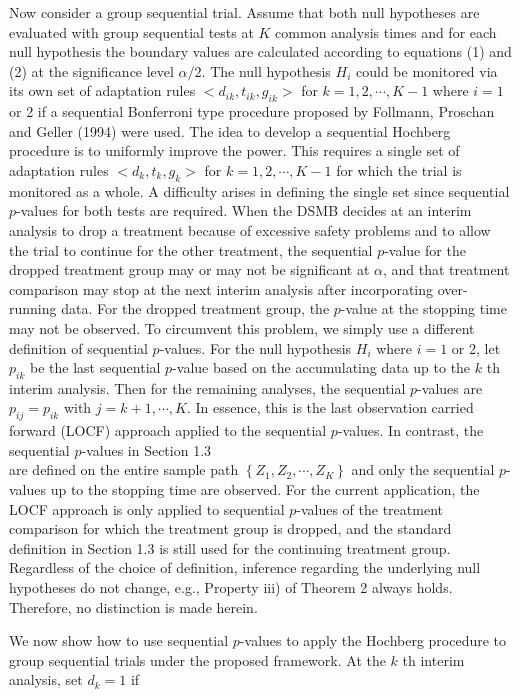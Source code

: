 \documentclass[10pt]{article}
\begin{document}
Now consider a group sequential trial. Assume that both null hypotheses are evaluated with group sequential tests at $K$ common analysis times and for each null hypothesis the boundary values are calculated according to equations (1) and (2) at the significance level $\alpha / 2$. The null hypothesis $H_{i}$ could be monitored via its own set of adaptation rules $<d_{i k}, t_{i k}, g_{i k}>$ for $k=1,2, \cdots, K-1$ where $i=1$ or 2 if a sequential Bonferroni type procedure proposed by Follmann, Proschan and Geller (1994) were used. The idea to develop a sequential Hochberg procedure is to uniformly improve the power. This requires a single set of adaptation rules $<d_{k}, t_{k}, g_{k}>$ for $k=1,2, \cdots, K-1$ for which the trial is monitored as a whole. A difficulty arises in defining the single set since sequential $p$-values for both tests are required. When the DSMB decides at an interim analysis to drop a treatment because of excessive safety problems and to allow the trial to continue for the other treatment, the sequential $p$-value for the dropped treatment group may or may not be significant at $\alpha$, and that treatment comparison may stop at the next interim analysis after incorporating over-running data. For the dropped treatment group, the $p$-value at the stopping time may not be observed. To circumvent this problem, we simply use a different definition of sequential $p$-values. For the null hypothesis $H_{i}$ where $i=1$ or 2, let $p_{i k}$ be the last sequential $p$-value based on the accumulating data up to the $k$ th interim analysis. Then for the remaining analyses, the sequential $p$-values are $p_{i j}=p_{i k}$ with $j=k+1, \cdots, K$. In essence, this is the last observation carried forward (LOCF) approach applied to the sequential $p$-values. In contrast, the sequential $p$-values in Section 1.3\\
are defined on the entire sample path $\left\{Z_{1}, Z_{2}, \cdots, Z_{K}\right\}$ and only the sequential $p$-values up to the stopping time are observed. For the current application, the LOCF approach is only applied to sequential $p$-values of the treatment comparison for which the treatment group is dropped, and the standard definition in Section 1.3 is still used for the continuing treatment group. Regardless of the choice of definition, inference regarding the underlying null hypotheses do not change, e.g., Property iii) of Theorem 2 always holds. Therefore, no distinction is made herein.

We now show how to use sequential $p$-values to apply the Hochberg procedure to group sequential trials under the proposed framework. At the $k$ th interim analysis, set $d_{k}=1$ if
\end{document}
